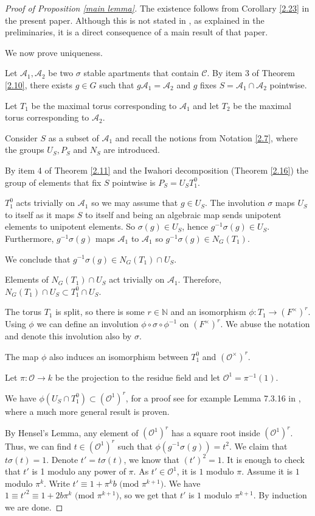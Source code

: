 \documentclass[12pt]{article}
\newcommand{\N}{\mathbb{N}}
\newcommand{\A}{\mathcal{A}}
\newcommand{\C}{\mathcal{C}}
\newcommand{\s}{\mathcal{O}}
\newcommand{\<}{\langle}
\renewcommand{\>}{\rangle}
\theoremstyle{plain}
\theoremstyle{definition}
\begin{document}
\begin{proof}[Proof of Proposition \ref{main lemma}]
The existence follows from Corollary \ref{2.23} in the present paper. 
Although this is not stated in \cite{delorm}, as explained in the preliminaries, it is a direct consequence of a main result of that paper.

We now prove uniqueness.

Let $\A_1,\A_2$ be two $\sigma$ stable apartments that contain $\C$. By item 3 of Theorem \ref{2.10}, there exists $g\in G$ such that $g\A_1=\A_2$ and $g$ fixes $S=\A_1\cap\A_2$ pointwise. 

Let $T_1$ be the maximal torus corresponding to $\A_1$ and let $T_2$ be the maximal torus corresponding to $\A_2$.

Consider $S$ as a subset of $\A_1$ and recall the notions from Notation \ref{2.7}, where the groups $U_S,P_S$ and $N_S$ are introduced. 


By item 4 of Theorem \ref{2.11} and the Iwahori decomposition (Theorem \ref{2.16}) the group of elements that fix $S$ pointwise is $P_S=U_ST_1^0$. 

 $T_1^0$ acts trivially on $\A_1$ so we may assume that $g\in U_S$. The involution $\sigma$ maps $U_S$ to itself as it maps $S$ to itself and being an algebraic map sends unipotent elements to unipotent elements. So $\sigma(g)\in U_S$, hence $g^{-1}\sigma(g)\in U_S$. Furthermore, $g^{-1}\sigma(g)$ maps $\A_1$ to $\A_1$ so $g^{-1}\sigma(g)\in N_G(T_1)$.
 
 We conclude that $g^{-1}\sigma(g)\in N_G(T_1)\cap U_S$.

 Elements of $N_G(T_1)\cap U_S$ act trivially on $\A_1$. Therefore,  $N_G(T_1)\cap U_S\subset T_1^0\cap U_S$.

 The torus $T_1$ is split, so there is some $r\in \N$ and an isomorphism $\phi:T_1\rightarrow (F^\times)^r$. Using $\phi$ we can define an involution $\phi\circ\sigma\circ \phi^{-1}$ on $(F^\times)^r$. We abuse the notation and denote this involution also by $\sigma$.
 
 The map $\phi$ also induces an isomorphism between $T_1^0$ and $(\s^\times)^r$. 

  Let $\pi:\s\rightarrow k$ be the projection to the residue field and let $\s^1=\pi^{-1}(1)$.

 We have $\phi(U_S\cap T_1^0)\subset (\s^1)^r$, for a proof see for example Lemma 7.3.16 in \cite{BruhatTitsTA}, where a much more general result is proven.

 By Hensel's Lemma, any element of $(\s^1)^r$ has a square root inside $(\s^1)^r$. Thus, we can find $t\in (\s^1)^r$ such that $\phi(g^{-1}\sigma(g))=t^2$. We claim that $t\sigma(t)=1$. Denote $t'=t\sigma(t)$, we know that $(t')^2=1$. It is enough to check that $t'$ is 1 modulo any power of $\pi$. As $t'\in \s^1$, it is $1$ modulo $\pi$. Assume it is $1$ modulo $\pi^k$. Write $t'\equiv 1 +\pi^{k}b \text{ (mod } \pi^{k+1})$. We have $1\equiv t'^2\equiv 1+2b\pi^k \text{ (mod } \pi^{k+1})$, so we get that $t'$ is $1$ modulo $\pi^{k+1}$. By induction we are done.  
 

\end{proof}
\end{document}

